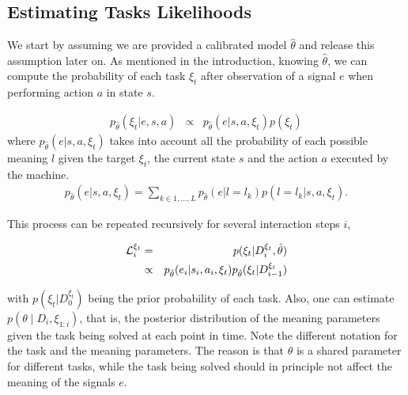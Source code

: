 
\subsection{Estimating Tasks Likelihoods}


We start by assuming we are provided a calibrated model $\hat{\theta}$ and release this assumption later on.
%
As mentioned in the introduction, knowing $\hat{\theta}$, we can compute the probability of each task $\xi_t$ after observation of a signal $e$ when performing action $a$ in state $s$.

\begin{eqnarray}
p_{\hat{\theta}}(\xi_t|e, s, a ) & \propto & p_{\hat{\theta}}(e |s, a, \xi_t) p(\xi_t)
\label{eq:1}
\end{eqnarray}
where  $p_{\hat{\theta}}(e |s, a, \xi_t)$ takes into account all the probability of each possible meaning $l$ given the target $\xi_t$, the current state $s$ and the action $a$ executed by the machine.
\begin{eqnarray}
p_{\hat{\theta}}(e |s, a,  \xi_t) =  \sum_{k \in {1, \ldots, L}} p_{\hat{\theta}}(e |l = l_k) p(l = l_k| s, a, \xi_t).
\end{eqnarray}

This process can be repeated recursively for several interaction steps $i$, 

\begin{eqnarray}
\mathcal{L}_i^{\xi_t} & = & p(\xi_t|D_i^{\xi_t}, \hat{\theta}) \nonumber \\
& \propto & p_{\hat{\theta}}(e_i |s_i, a_i, \xi_t) p_{ \hat{\theta}}(\xi_t|D_{i-1}^{\xi_t})
\label{eq:filter}
\end{eqnarray}

with $p(\xi_t|D_0^{\xi_t})$ being the prior probability of each task. Also, one can estimate $p(\theta \mid D_i, \xi_{1:i})$, that is, the posterior distribution of the meaning parameters given the task being solved at each point in time. Note the different notation for the task and the meaning parameters. The reason is that $\theta$ is a shared parameter for different tasks, while the task being solved should in principle not affect the meaning of the signals $e$.

